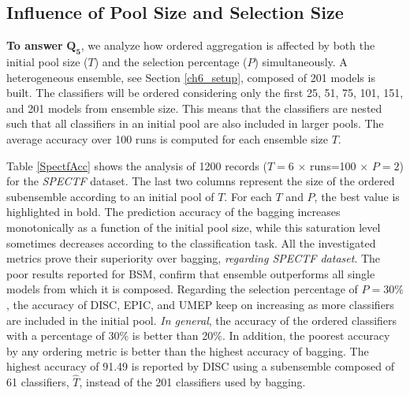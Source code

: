 %
%

\subsection{Influence of Pool Size and Selection Size} \label{p-size.s-size}
\textbf{To answer} $\pmb{Q_5}$, we analyze how ordered aggregation is affected by both the initial pool size ($T$) and the selection percentage ($P$) simultaneously. A heterogeneous ensemble, see Section \ref{ch6_setup}, composed of 201 models is built. The classifiers will be ordered considering only the first 25, 51, 75, 101, 151, and 201 models from ensemble size. This means that the classifiers are nested such that all classifiers in an initial pool are also included in larger pools. The average accuracy over 100 runs is computed for each ensemble size $T$. 

Table \ref{SpectfAcc} shows the analysis of 1200 records ($T=6$ $\times$ runs=100 $\times$ $P=2$) for the \textit{SPECTF} dataset. The last two columns represent the size of the ordered subensemble according to an initial pool of $T$. For each $T$ and $P$, the best value is highlighted in bold. The prediction accuracy of the bagging increases monotonically as a function of the initial pool size, while this saturation level sometimes decreases according to the classification task. All the investigated metrics prove their superiority over bagging, \textit{regarding SPECTF dataset}. The poor results reported for BSM, confirm that ensemble outperforms all single models from which it is composed. Regarding the selection percentage of $P=30\%$, the accuracy of DISC, EPIC, and UMEP keep on increasing as more classifiers are included in the initial pool. \textit{In general}, the accuracy of the ordered classifiers with a percentage of 30\% is better than 20\%. In addition, the poorest accuracy by any ordering metric is better than the highest accuracy of bagging. The highest accuracy of 91.49 is reported by DISC using a subensemble composed of 61 classifiers, $\hat{T}$, instead of the 201 classifiers used by bagging. 


